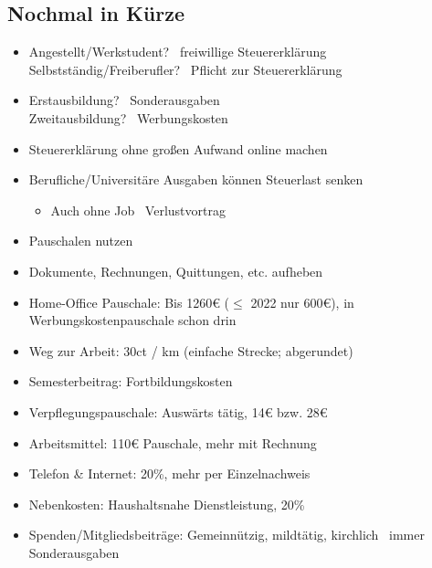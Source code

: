 \documentclass{beamer}
\begin{document}
		\subsection{Nochmal in Kürze}
		
			\begin{frame}
				\begin{itemize}
					\item Angestellt/Werkstudent? \textrightarrow\ freiwillige Steuererklärung\\
					Selbstständig/Freiberufler? \textrightarrow\ Pflicht zur Steuererklärung
					\item Erstausbildung? \textrightarrow\ Sonderausgaben\\
					Zweitausbildung? \textrightarrow\ Werbungskosten\vspace{-0.1cm}\pause
					\item Steuererklärung ohne großen Aufwand online machen\pause
					\item Berufliche/Universitäre Ausgaben können Steuerlast senken
					\begin{itemize}
						\item Auch ohne Job \textrightarrow\ Verlustvortrag
					\end{itemize}
					\item Pauschalen nutzen
					\item Dokumente, Rechnungen, Quittungen, etc. aufheben\pause
				\end{itemize}
			\end{frame}
		
			\begin{frame}
				\begin{itemize}
					\item Home-Office Pauschale: Bis 1260€ ($\leq$ 2022 nur 600€), in Werbungskostenpauschale schon drin
					\item Weg zur Arbeit: 30ct / km (einfache Strecke; abgerundet)
					\item Semesterbeitrag: Fortbildungskosten
					\item Verpflegungspauschale: Auswärts tätig, 14€ bzw. 28€
					\item Arbeitsmittel: 110€ Pauschale, mehr mit Rechnung
					\item Telefon \& Internet: 20\%, mehr per Einzelnachweis
					\item Nebenkosten: Haushaltsnahe Dienstleistung, 20\%
					\item Spenden/Mitgliedsbeiträge: Gemeinnützig, mildtätig, kirchlich \textrightarrow\ immer Sonderausgaben
				\end{itemize}
			\end{frame}
		
\end{document}
